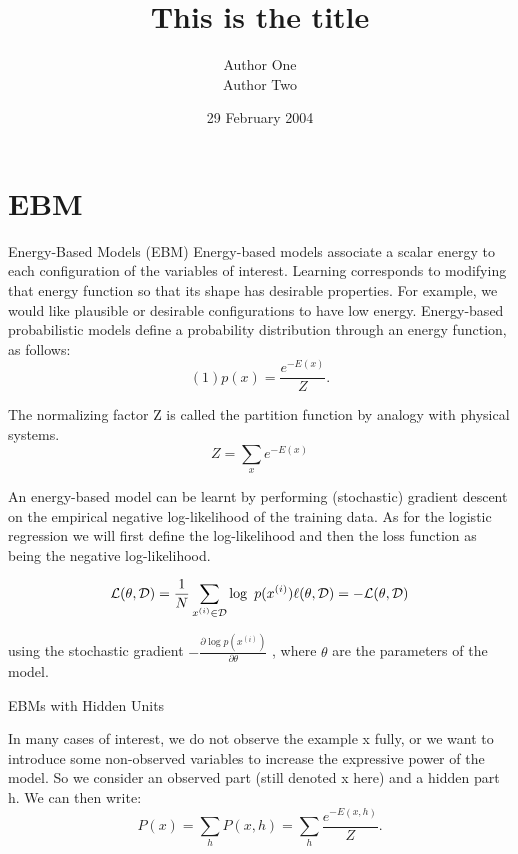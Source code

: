 \documentclass[12pt]{article}
\title{This is the title}
\author{Author One \\ Author Two}
\date{29 February 2004}
\begin{document}
\maketitle

\section{EBM}

Energy-Based Models (EBM)
Energy-based models associate a scalar energy to each configuration of the variables of interest. Learning corresponds to modifying that energy function so that its shape has desirable properties. For example, we would like plausible or desirable configurations to have low energy. Energy-based probabilistic models define a probability distribution through an energy function, as follows:
\begin{equation}
(1)p(x) = \frac {e^{-E(x)}} {Z}.
\end{equation}


The normalizing factor Z is called the partition function by analogy with physical systems.
\begin{equation}
Z = \sum_x e^{-E(x)}
\end{equation}


An energy-based model can be learnt by performing (stochastic) gradient descent on the empirical negative log-likelihood of the training data. As for the logistic regression we will first define the log-likelihood and then the loss function as being the negative log-likelihood.

\begin{equation}
\mathcal{L}(\theta, \mathcal{D}) = \frac{1}{N} \sum_{x^{(i)} \in
\mathcal{D}} \log\ p(x^{(i)})\\
\ell (\theta, \mathcal{D}) = - \mathcal{L} (\theta, \mathcal{D})
\end{equation}


using the stochastic gradient $-\frac{\partial  \log p(x^{(i)})}{\partial 
\theta}$ , where $\theta$ are the parameters of the model.




EBMs with Hidden Units

In many cases of interest, we do not observe the example x fully, or we want to introduce some non-observed variables to increase the expressive power of the model. So we consider an observed part (still denoted x here) and a hidden part h. We can then write:
\begin{equation}
P(x) = \sum_h P(x,h) = \sum_h \frac{e^{-E(x,h)}}{Z}.
\end{equation}
\end{document}
